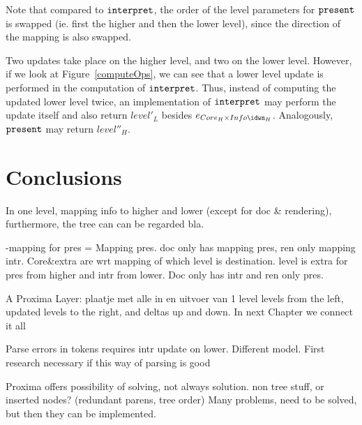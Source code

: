 Note that compared to ${\tt interpret}$, the order of the level parameters for 
${\tt present}$ is swapped (ie. first the higher and then the lower level), since the direction of the mapping is also swapped. 

Two updates take place on the higher level, and two on the lower level. However, if we look at Figure~\ref{computeOps}, we can see that a lower level update is performed in the computation of
 ${\tt interpret}$. Thus, instead of computing the updated lower level twice, an implementation of 
 ${\tt interpret}$ may perform the update itself and also return $level'_{L}$ besides
 $e_{Core_{H} \times Info\idwn_{H}}$.  Analogously, ${\tt present}$ may return $level''_{H}$. 
 



%																
\section{Conclusions}

\toHere     %

In one level,  mapping info to higher and lower (except for doc \& rendering), furthermore, the tree can can be regarded bla.

-mapping for pres = Mapping pres. doc only has mapping pres, ren only mapping intr. Core\&extra are wrt mapping of which level is destination. level is extra for pres from higher and intr from lower. Doc only has intr  and ren only pres.

A Proxima Layer:
plaatje met alle in en uitvoer van 1 level
levels from the left, updated levels to the right, and deltas up and down. In next Chapter we connect it all


Parse errors in tokens requires intr update on lower. Different model. First research necessary if this way of parsing is good

Proxima offers possibility of solving, not always solution. non tree stuff, or inserted nodes? (redundant parens, tree order) Many problems, need to be solved, but then they can be implemented.


